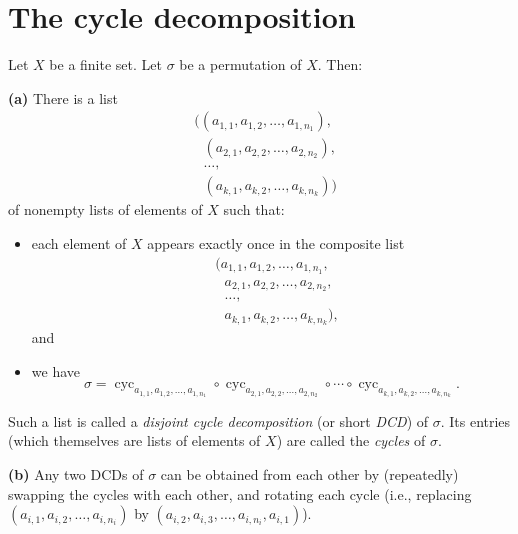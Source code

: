 \section{The cycle decomposition}

\begin{theorem}
\label{thm.perm.dcd.main}
\leantarget
\leanok
Let $X$
be a finite set. Let $\sigma$ be a permutation of $X$. Then: \medskip

\textbf{(a)} There is a list%
\begin{align*}
&  \Big(\left(  a_{1,1},a_{1,2},\ldots,a_{1,n_{1}}\right)  ,\\
&  \ \ \ \left(  a_{2,1},a_{2,2},\ldots,a_{2,n_{2}}\right)  ,\\
&  \ \ \ \ldots,\\
&  \ \ \ \left(  a_{k,1},a_{k,2},\ldots,a_{k,n_{k}}\right)  \Big)
\end{align*}
of nonempty lists of elements of $X$ such that:

\begin{itemize}
\item each element of $X$ appears exactly once in the composite list%
\begin{align*}
&  (a_{1,1},a_{1,2},\ldots,a_{1,n_{1}},\\
&  \ \ \ a_{2,1},a_{2,2},\ldots,a_{2,n_{2}},\\
&  \ \ \ \ldots,\\
&  \ \ \ a_{k,1},a_{k,2},\ldots,a_{k,n_{k}}),
\end{align*}
and

\item we have%
\[
\sigma=\operatorname*{cyc}\nolimits_{a_{1,1},a_{1,2},\ldots,a_{1,n_{1}}}%
\circ\operatorname*{cyc}\nolimits_{a_{2,1},a_{2,2},\ldots,a_{2,n_{2}}}%
\circ\cdots\circ\operatorname*{cyc}\nolimits_{a_{k,1},a_{k,2},\ldots
,a_{k,n_{k}}}.
\]

\end{itemize}

Such a list is called a \emph{disjoint cycle decomposition} (or short
\emph{DCD}) of $\sigma$. Its entries (which themselves are lists of elements
of $X$) are called the \emph{cycles} of $\sigma$. \medskip

\textbf{(b)} Any two DCDs of $\sigma$ can be obtained from each other by
(repeatedly) swapping the cycles with each other, and rotating each cycle
(i.e., replacing $\left(  a_{i,1},a_{i,2},\ldots,a_{i,n_{i}}\right)  $ by
$\left(  a_{i,2},a_{i,3},\ldots,a_{i,n_{i}},a_{i,1}\right)  $). \medskip


\end{theorem}
